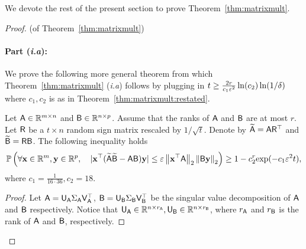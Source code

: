 We devote the rest of the present section to prove Theorem~\ref{thm:matrixmult}.
%
%
\begin{proof}(of Theorem~\ref{thm:matrixmult})
%
\paragraph{Part (\textit{i.a}):}
We prove the following more general theorem from which Theorem~\ref{thm:matrixmult} (\textit{i.a}) follows by plugging in $t\geq \frac{2r}{c_1\varepsilon^2} \ln (c_2) \ln(1/\delta)$ where $c_1,c_2$ is as in Theorem~\ref{thm:matrixmult:restated}.
\begin{theorem}\label{thm:matrixmult:restated}
Let ${\mathsf{A} }\in{\mathbb{R}^{m\times n}}$ and ${\mathsf{B} }\in{\mathbb{R}^{ n\times p}}$. Assume that the ranks of ${\mathsf{A} }$ and ${\mathsf{B} }$ are at most $r$. Let ${\mathsf{R} }$ be a $t\times n$ random sign matrix rescaled by $1/\sqrt{t}$. Denote by $\widetilde{{\mathsf{A} }}= {\mathsf{A} }{\mathsf{R} }^\top$ and $\widetilde{{\mathsf{B} }}= {\mathsf{R} }{\mathsf{B} }$. The following inequality
holds
\[ \mathbb{P}\left( \forall \mathbf{x}\in\mathbb{R}^m, \mathbf{y}\in\mathbb{R}^p, \quad  |\mathbf{x}^\top (\widetilde{{\mathsf{A} }} \widetilde{{\mathsf{B} }} - {\mathsf{A} } {\mathsf{B} })\mathbf{y}| \leq \varepsilon \left\|\mathbf{x}^\top {\ensuremath{\mathsf{A} }}\right\|_2 \left\|{\mathsf{B} }\mathbf{y}\right\|_2 \right)  \geq 1- c_2^{r} \hbox{\textrm exp} (-c_1 \varepsilon^2 t), \]
where $c_1 = \frac1{16 \cdot 36},c_2 = 18$.
\end{theorem}
\begin{proof}
Let ${\mathsf{A} }={\mathsf{U} }_{{\mathsf{A} }}\Sigma_{{\mathsf{A} }} {\mathsf{V} }_{{\mathsf{A} }}^\top$, ${\mathsf{B} }={\mathsf{U} }_{{\mathsf{B} }} \Sigma_{{\mathsf{B} }} {\mathsf{V} }^\top_{{\mathsf{B} }}$ be the singular value decomposition of ${\mathsf{A} }$ and ${\mathsf{B} }$ respectively. Notice that ${\mathsf{U} }_{{\mathsf{A} }}\in{\mathbb{R}^{n\times r_{ {\ensuremath{\mathsf{A} }}} } }, {\mathsf{U} }_{{\mathsf{B} }}\in{\mathbb{R}^{n\times r_{ {\ensuremath{\mathsf{B} }}} }}$, where $r_{{\mathsf{A} }}$ and $r_{{\mathsf{B} }}$ is the rank of ${\mathsf{A} }$ and ${\mathsf{B} }$, respectively.
%


\end{proof}
\end{proof}
